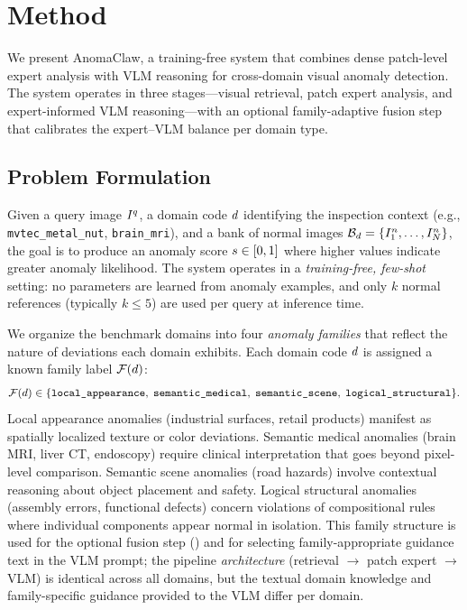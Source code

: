 \section{Method}
\label{sec:method}

We present AnomaClaw, a training-free system that combines dense patch-level expert analysis with VLM reasoning for cross-domain visual anomaly detection.
The system operates in three stages---visual retrieval, patch expert analysis, and expert-informed VLM reasoning---with an optional family-adaptive fusion step that calibrates the expert--VLM balance per domain type.

\subsection{Problem Formulation}
\label{sec:formulation}

Given a query image $I^q$, a domain code $d$ identifying the inspection context (e.g., \texttt{mvtec\_metal\_nut}, \texttt{brain\_mri}), and a bank of normal images $\mathcal{B}_d = \{I^n_1, \ldots, I^n_N\}$, the goal is to produce an anomaly score $s \in [0,1]$ where higher values indicate greater anomaly likelihood.
The system operates in a \emph{training-free, few-shot} setting: no parameters are learned from anomaly examples, and only $k$ normal references (typically $k \leq 5$) are used per query at inference time.

We organize the benchmark domains into four \emph{anomaly families} that reflect the nature of deviations each domain exhibits. Each domain code $d$ is assigned a known family label $\mathcal{F}(d)$:
\begin{equation}
    \mathcal{F}(d) \in \{\texttt{local\_appearance},\; \texttt{semantic\_medical},\; \texttt{semantic\_scene},\; \texttt{logical\_structural}\}.
    \label{eq:families}
\end{equation}
Local appearance anomalies (industrial surfaces, retail products) manifest as spatially localized texture or color deviations.
Semantic medical anomalies (brain MRI, liver CT, endoscopy) require clinical interpretation that goes beyond pixel-level comparison.
Semantic scene anomalies (road hazards) involve contextual reasoning about object placement and safety.
Logical structural anomalies (assembly errors, functional defects) concern violations of compositional rules where individual components appear normal in isolation.
This family structure is used for the optional fusion step () and for selecting family-appropriate guidance text in the VLM prompt; the pipeline \emph{architecture} (retrieval $\to$ patch expert $\to$ VLM) is identical across all domains, but the textual domain knowledge and family-specific guidance provided to the VLM differ per domain.

